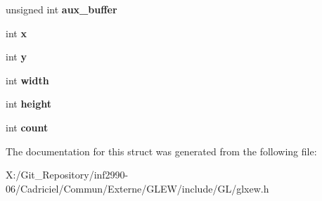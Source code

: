 \begin{DoxyCompactItemize}
\item 
\hypertarget{struct_g_l_x_pbuffer_clobber_event_a13193b6e7e3e52b15f754fe91403b7ec}{unsigned int {\bfseries aux\-\_\-buffer}}\label{struct_g_l_x_pbuffer_clobber_event_a13193b6e7e3e52b15f754fe91403b7ec}

\item 
\hypertarget{struct_g_l_x_pbuffer_clobber_event_a8f0a7162a033c89ee94ce535580dbc32}{int {\bfseries x}}\label{struct_g_l_x_pbuffer_clobber_event_a8f0a7162a033c89ee94ce535580dbc32}

\item 
\hypertarget{struct_g_l_x_pbuffer_clobber_event_a69eb7ac60d36ac3ec4550ac206cfc61f}{int {\bfseries y}}\label{struct_g_l_x_pbuffer_clobber_event_a69eb7ac60d36ac3ec4550ac206cfc61f}

\item 
\hypertarget{struct_g_l_x_pbuffer_clobber_event_aaca375fecb872c73c60cd5d0bfc7c7a5}{int {\bfseries width}}\label{struct_g_l_x_pbuffer_clobber_event_aaca375fecb872c73c60cd5d0bfc7c7a5}

\item 
\hypertarget{struct_g_l_x_pbuffer_clobber_event_aed4e539c896bdad15217bf92c28f8520}{int {\bfseries height}}\label{struct_g_l_x_pbuffer_clobber_event_aed4e539c896bdad15217bf92c28f8520}

\item 
\hypertarget{struct_g_l_x_pbuffer_clobber_event_a61e9f6b31738464dca67f909fcacd298}{int {\bfseries count}}\label{struct_g_l_x_pbuffer_clobber_event_a61e9f6b31738464dca67f909fcacd298}

\end{DoxyCompactItemize}


The documentation for this struct was generated from the following file\-:\begin{DoxyCompactItemize}
\item 
X\-:/\-Git\-\_\-\-Repository/inf2990-\/06/\-Cadriciel/\-Commun/\-Externe/\-G\-L\-E\-W/include/\-G\-L/glxew.\-h\end{DoxyCompactItemize}
